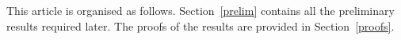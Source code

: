 \documentclass[12pt]{article}
\newtheorem{maintheorem}{Theorem}
\begin{document}
This article is organised as follows. Section~\ref{prelim} contains all the preliminary results required later. The proofs of the results are provided in Section~\ref{proofs}.
%


%
\end{document}
